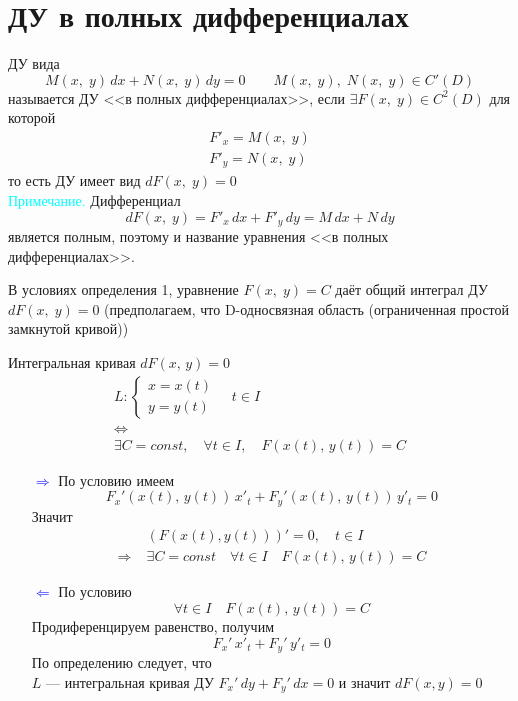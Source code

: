 \section{ДУ в полных дифференциалах}
\begin{Def}
    ДУ вида
    \[
        M(x,\;y)\,dx+N(x,\;y)\,dy=0 \qquad M(x,\;y),\; N(x,\;y)\in C'(D)
    \] 
    называется ДУ <<в полных дифференциалах>>, если $\exists F(x,\;y) \in C^2(D)$ для которой
    \begin{gather*}
        F'_x=M(x,\;y)\\
        F'_y=N(x,\;y)
    \end{gather*}
    то есть ДУ имеет вид $dF(x,\;y)=0$\\
    
    \textcolor{cyan}{Примечание.} Дифференциал \[dF(x,\;y)=F'_x\,dx+F'_y\, dy=M\,dx+N\,dy\] является полным, поэтому и название уравнения <<в полных дифференциалах>>.
\end{Def}

\begin{Th}
    В условиях определения 1, уравнение $F(x,\;y) = C$ даёт общий интеграл ДУ $dF(x,\;y)=0$ (предполагаем, что D-односвязная область (ограниченная простой замкнутой кривой))
\end{Th}

\begin{Proof}
    Интегральная кривая $dF(x,\, y) = 0$
    \begin{gather*}
        L:
        \begin{cases}
            x=x(t)\\
            y=y(t) 
        \end{cases} \quad t\in I\\
        \Leftrightarrow\\
        \exists C = const, \quad \forall t \in I, \quad F(x(t),\, y(t))= C
    \end{gather*}
    \begin{enumerate}
        \item[\textcolor{blue}{$\Rightarrow$}]
        По условию имеем
        \[
            F_x'(x(t),\,y(t))\,x'_t+F_y'(x(t),\,y(t))\,y'_t=0
        \]
        Значит
        \begin{align*}
            &(F(x(t),y(t)))'=0, \quad t \in I\\
            \Rightarrow \; &\exists C = const \quad \forall t \in I \quad F(x(t),\, y(t)) = C
        \end{align*}
        
        \item[\textcolor{blue}{$\Leftarrow$}] По условию 
        \[
            \forall t \in I \quad F(x(t),\, y(t))= C
        \]
        Продиференцируем равенство, получим
        \[
            F_x'\,x'_t + F_y'\,y'_t = 0
        \]
        По определению следует, что\\
        $L$ --- интегральная кривая ДУ $F_x'\,dy+F_y'\,dx = 0$ и значит $dF(x,y)=0$
    \end{enumerate}
\end{Proof}

